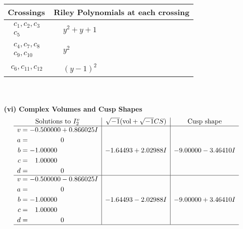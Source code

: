 \documentclass[1p]{elsarticle_modified}
\theoremstyle{definition}
\newcommand{\I}{\sqrt{-1}}
\begin{document}
\begin{tabular}{m{50pt}|m{274pt}}
Crossings & \hspace{64pt}Riley Polynomials at each crossing \\
\hline $$\begin{aligned}c_{1},c_{2},c_{3}\\c_{5}\end{aligned}$$&$\begin{aligned}
&y^2+y+1
\end{aligned}$\\
\hline $$\begin{aligned}c_{4},c_{7},c_{8}\\c_{9},c_{10}\end{aligned}$$&$\begin{aligned}
&y^2
\end{aligned}$\\
\hline $$\begin{aligned}c_{6},c_{11},c_{12}\end{aligned}$$&$\begin{aligned}
&(y-1)^2
\end{aligned}$\\
\hline
\end{tabular}\\~\\
\newpage\flushleft \textbf{(vi) Complex Volumes and Cusp Shapes}
$$\begin{array}{c|c|c}  
\text{Solutions to }I^v_{2}& \I (\text{vol} + \sqrt{-1}CS) & \text{Cusp shape}\\
 \hline 
\begin{aligned}
v &= -0.500000 + 0.866025 I \\
a &= \phantom{-0.000000 } 0 \\
b &= -1.00000\phantom{ +0.000000I} \\
c &= \phantom{-}1.00000\phantom{ +0.000000I} \\
d &= \phantom{-0.000000 } 0\end{aligned}
 & -1.64493 + 2.02988 I & -9.00000 - 3.46410 I \\ \hline\begin{aligned}
v &= -0.500000 - 0.866025 I \\
a &= \phantom{-0.000000 } 0 \\
b &= -1.00000\phantom{ +0.000000I} \\
c &= \phantom{-}1.00000\phantom{ +0.000000I} \\
d &= \phantom{-0.000000 } 0\end{aligned}
 & -1.64493 - 2.02988 I & -9.00000 + 3.46410 I\\
 \hline 
 \end{array}$$\newpage\newpage\renewcommand{\arraystretch}{1}
\end{document}

